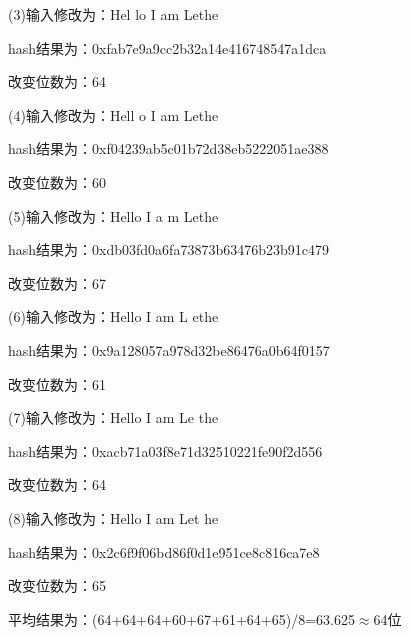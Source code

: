\documentclass[UTF8,a4paper]{article}
\begin{document}
(3)输入修改为：Hel lo I am Lethe\par 
hash结果为：0xfab7e9a9cc2b32a14e416748547a1dca\par 
改变位数为：64\par 



(4)输入修改为：Hell o I am Lethe\par 
hash结果为：0xf04239ab5c01b72d38eb5222051ae388\par 
改变位数为：60\par 



(5)输入修改为：Hello I a m Lethe\par 
hash结果为：0xdb03fd0a6fa73873b63476b23b91c479\par 
改变位数为：67\par 



(6)输入修改为：Hello I am L ethe\par 
hash结果为：0x9a128057a978d32be86476a0b64f0157\par 
改变位数为：61\par 



(7)输入修改为：Hello I am Le the\par 
hash结果为：0xacb71a03f8e71d32510221fe90f2d556\par 
改变位数为：64\par 



(8)输入修改为：Hello I am Let he\par 
hash结果为：0x2c6f9f06bd86f0d1e951ce8c816ca7e8\par 
改变位数为：65\par 


平均结果为：(64+64+64+60+67+61+64+65)/8=63.625$\approx$64位\par 
\end{document}
